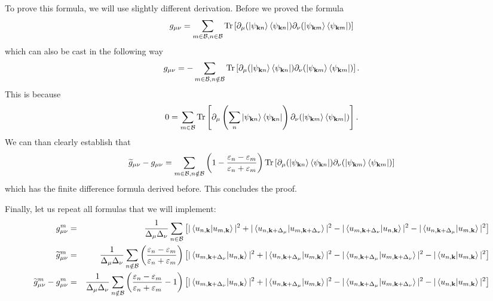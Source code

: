 \documentclass[onecolumn, prb,preprintnumbers,amsmath,amssymb,floatfix]{revtex4}
\newcommand{\vk}{{\mathbf{k}}}
\newcommand{\Tr}{\mathrm{Tr}} \newcommand{\npsi}{\underline{\psi}}
\newcommand{\cb}{{\cal B}}
\begin{document}
To prove this formula, we will use slightly different derivation. Before we proved the formula
\begin{eqnarray}
g_{\mu\nu}=  \sum_{m\in\cb,n\in\cb}
  \Tr\left[ \partial_\mu(\ket{\psi_{\vk n}}\bra{\psi_{\vk n}})  \partial_\nu (\ket{\psi_{\vk m}}\bra{\psi_{\vk m}})
  \right]
\end{eqnarray}  
which can also be cast in the following way
\begin{eqnarray}
g_{\mu\nu}=  -\sum_{m\in\cb,n\notin\cb}
  \Tr\left[ \partial_\mu(\ket{\psi_{\vk n}}\bra{\psi_{\vk n}})  \partial_\nu (\ket{\psi_{\vk m}}\bra{\psi_{\vk m}})
  \right].
\end{eqnarray}  
This is because 
\begin{eqnarray}
0=  \sum_{m\in\cb}
  \Tr\left[ \partial_\mu\left(\sum_n\ket{\psi_{\vk n}}\bra{\psi_{\vk n}}\right)  \partial_\nu (\ket{\psi_{\vk m}}\bra{\psi_{\vk m}})
  \right].
\end{eqnarray}  
We can than clearly establish that 
\begin{eqnarray}
\widetilde{g}_{\mu\nu}-g_{\mu\nu}=  \sum_{m\in\cb,n\notin\cb}\left(1-\frac{\varepsilon_n-\varepsilon_m}{\varepsilon_n+\varepsilon_m}\right)
  \Tr\left[ \partial_\mu(\ket{\psi_{\vk n}}\bra{\psi_{\vk n}})  \partial_\nu (\ket{\psi_{\vk m}}\bra{\psi_{\vk m}})
  \right]
\end{eqnarray}  
which has the finite difference formula derived before. This concludes
the proof.

Finally, let us repeat all formulas that we will implement:
\begin{eqnarray}
  g^m_{\mu\nu} &=&   \frac{1}{\Delta_\mu\Delta_\nu}
\sum_{n\in\cb}
  \left[
    |\braket{u_{n,\vk}|u_{m,\vk}}|^2 
    +|\braket{u_{n,\vk+\Delta_\mu}|u_{m,\vk+\Delta_\nu}}|^2 
    -|\braket{u_{m,\vk+\Delta_\nu}|u_{n,\vk}}|^2
    -|\braket{u_{n,\vk+\Delta_\mu}|u_{m,\vk}}|^2
  \right]
\nonumber\\
  \widetilde{g}^m_{\mu\nu} &=&   \frac{1}{\Delta_\mu\Delta_\nu}
\sum_{n\notin\cb}\left(\frac{\varepsilon_n-\varepsilon_m}{\varepsilon_n+\varepsilon_m}\right)
  \left[
    |\braket{u_{m,\vk+\Delta_\nu}|u_{n,\vk}}|^2
    +|\braket{u_{n,\vk+\Delta_\mu}|u_{m,\vk}}|^2
    -|\braket{u_{n,\vk+\Delta_\mu}|u_{m,\vk+\Delta_\nu}}|^2 
    -|\braket{u_{n,\vk}|u_{m,\vk}}|^2
  \right]
\nonumber\\
  \widetilde{g}^m_{\mu\nu}-g^m_{\mu\nu}&=&
  \frac{1}{\Delta_\mu\Delta_\nu}
\sum_{n\notin\cb}\left(\frac{\varepsilon_n-\varepsilon_m}{\varepsilon_n+\varepsilon_m}-1\right)
  \left[
    |\braket{u_{m,\vk+\Delta_\nu}|u_{n,\vk}}|^2
    +|\braket{u_{n,\vk+\Delta_\mu}|u_{m,\vk}}|^2
    -|\braket{u_{n,\vk+\Delta_\mu}|u_{m,\vk+\Delta_\nu}}|^2 
    -|\braket{u_{n,\vk}|u_{m,\vk}}|^2
  \right]
\nonumber
\end{eqnarray}  
\end{document}
